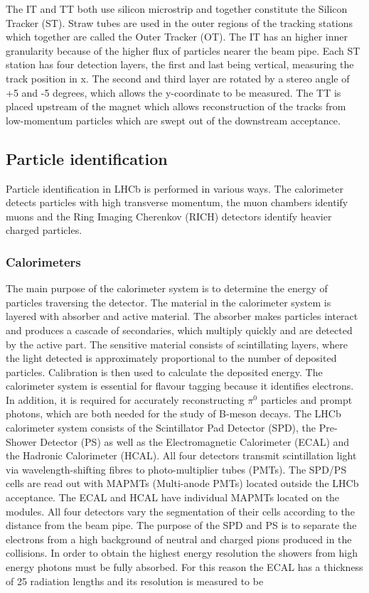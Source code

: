 The IT and TT both use silicon microstrip and together constitute the Silicon Tracker (ST). Straw tubes are used 
in the outer regions of the tracking stations which together are called the Outer Tracker (OT). The IT has 
an higher inner granularity because of the higher flux of particles nearer the beam pipe. Each ST station 
has four detection layers, the first and last being vertical, measuring the track position in x. The second 
and third layer are rotated by a stereo angle of +5 and -5 degrees, which allows the y-coordinate to be measured. 
The TT is placed upstream of the magnet which allows reconstruction of the tracks from low-momentum particles which 
are swept out of the downstream acceptance.

\subsection{Particle identification}

Particle identification in LHCb is performed in various ways. The calorimeter detects particles with high 
transverse momentum, the muon chambers identify muons and the Ring Imaging Cherenkov (RICH) detectors identify 
heavier charged particles.

\subsubsection{Calorimeters}
\label{sec:calorimeters}

The main purpose of the calorimeter system is to determine the energy of particles traversing the detector. 
The material in the calorimeter system is layered with absorber and active material. The absorber makes particles
interact and produces a cascade of secondaries, which multiply quickly and are detected by the active part. 
The sensitive material consists of scintillating layers, where the light detected is approximately proportional 
to the number of deposited particles. Calibration is then used to calculate the deposited energy. The calorimeter 
system is essential for flavour tagging because it identifies electrons. In addition, it is required for accurately 
reconstructing
$\pi^0$ particles and prompt photons, which are both needed for the study of B-meson decays. The LHCb calorimeter 
system consists of the Scintillator Pad Detector (SPD), the Pre-Shower Detector (PS) as well as the Electromagnetic 
Calorimeter (ECAL) and the Hadronic Calorimeter (HCAL). All four detectors transmit scintillation light via 
wavelength-shifting fibres to photo-multiplier tubes (PMTs). The SPD/PS cells are read out with MAPMTs 
(Multi-anode PMTs) located outside the LHCb acceptance. The ECAL and HCAL have individual MAPMTs located on the modules.
All four detectors vary the segmentation of their cells according to the distance from the beam pipe.
The purpose of the SPD and PS is to separate the electrons from a high background of neutral and charged pions 
produced in the collisions. In order to obtain the highest energy resolution the showers from high energy photons 
must be fully absorbed. For this reason the ECAL has a thickness of 25 radiation lengths and its resolution is 
measured to be \cite{Alves:2008zz}
 
